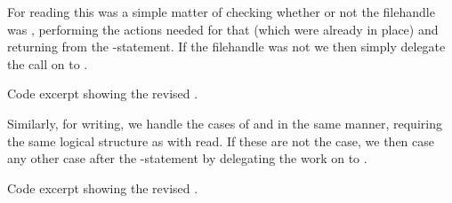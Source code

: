 For reading this was a simple matter of checking whether or not the filehandle
was  , performing the actions
needed for that (which were already in place) and returning from the
-statement. If the filehandle was not  we
then simply delegate the call on to .

{Code excerpt showing the revised .}

Similarly, for writing, we handle the cases of  and
 in the same manner, requiring the same logical
structure as with read. If these are not the case, we then case any other case
after the -statement by delegating the work on to .

{Code excerpt showing the revised .}

